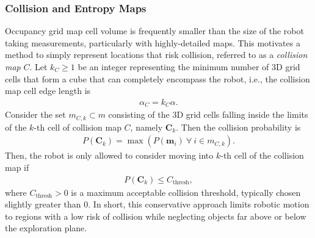 \subsubsection{Collision and Entropy Maps}
Occupancy grid map cell volume is frequently smaller than the size of the robot taking measurements, particularly with highly-detailed maps. This motivates a method to simply represent locations that risk collision, referred to as a \emph{collision map} $C$. Let $k_C\geq1$ be an integer representing the minimum number of 3D grid cells that form a cube that can completely encompass the robot, i.e., the collision map cell edge length is
\begin{align}
\label{eqn:alphaC}
\alpha_C=k_C\alpha.
\end{align}
Consider the set $m_{C,k}\subset m$ consisting of the 3D grid cells falling inside the limits of the $k$-th cell of collision map $C$, namely $\mathbf{C}_k$. Then the collision probability is
\begin{align}
P(\mathbf{C}_k)=\max{(P(\mathbf{m}_i)\ \forall \ i\in m_{C,k})}.
\end{align}
Then, the robot is only allowed to consider moving into $k$-th cell of the collision map if
\begin{align}
P(\mathbf{C}_k) \leq C_\text{thresh},
\end{align}
where $C_\text{thresh}>0$ is a maximum acceptable collision threshold, typically chosen slightly greater than $0$. In short, this conservative approach limits robotic motion to regions with a low risk of collision while neglecting objects far above or below the exploration plane.

